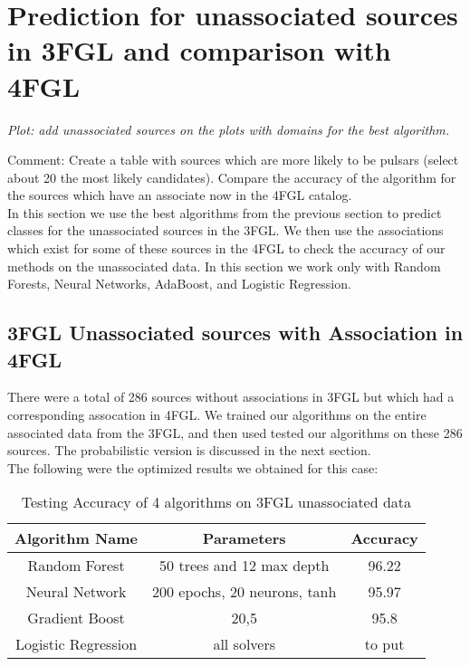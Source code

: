 \section{Prediction for unassociated sources in 3FGL and comparison with 4FGL}



{\it Plot: add unassociated sources on the plots with domains for the best algorithm.}

Comment: Create a table with sources which are more likely to be pulsars (select about 20 the most likely candidates).
Compare the accuracy of the algorithm for the sources which have an associate now in the 4FGL catalog.\\

In this section we use the best algorithms from the previous section to predict classes for the unassociated sources in the 3FGL. We then use the associations which exist for some of these sources in the 4FGL to check the accuracy of our methods on the unassociated data. In this section we work only with Random Forests, Neural Networks, AdaBoost, and Logistic Regression. \\


\subsection{3FGL Unassociated sources with Association in 4FGL}
There were a total of 286 sources without associations in 3FGL but which had a corresponding assocation in 4FGL. We trained our algorithms on the entire associated data from the 3FGL, and then used tested our algorithms on these 286 sources. The probabilistic version is discussed in the next section.  \\

The following were the optimized results we obtained for this case:\\

\begin{table}[!h]
    \tiny
    \centering
    \renewcommand{\tabcolsep}{1mm}
\renewcommand{\arraystretch}{1.5}

    \begin{tabular}{|c|c|c|}
    \hline
    Algorithm Name&Parameters & Accuracy\\
    \hline
    Random Forest& 50 trees and 12 max depth & 96.22   \\
    \hline
    Neural Network & 200 epochs, 20 neurons, tanh     &  95.97 \\
    \hline %
    Gradient Boost& 20,5    &   95.8  \\
    \hline %
    Logistic Regression& all solvers &to put  \\
    \hline
     
    \end{tabular}

    \caption{Testing Accuracy of 4 algorithms on 3FGL unassociated data}
    \label{tab:my_labe2l}
\end{table}


